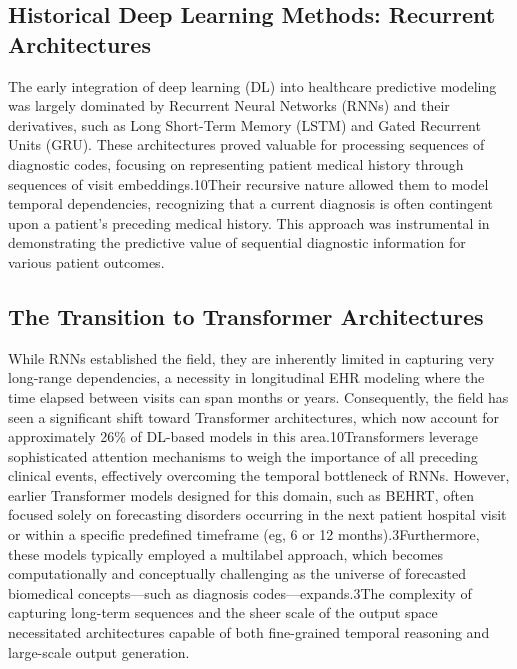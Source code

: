 \subsection{Historical Deep Learning Methods: Recurrent Architectures}
The early integration of deep learning (DL) into healthcare predictive modeling was largely dominated by Recurrent Neural Networks (RNNs) and their derivatives, such as Long Short-Term Memory (LSTM) and Gated Recurrent Units (GRU). These architectures proved valuable for processing sequences of diagnostic codes, focusing on representing patient medical history through sequences of visit embeddings.10Their recursive nature allowed them to model temporal dependencies, recognizing that a current diagnosis is often contingent upon a patient's preceding medical history. This approach was instrumental in demonstrating the predictive value of sequential diagnostic information for various patient outcomes.

\subsection{The Transition to Transformer Architectures}
While RNNs established the field, they are inherently limited in capturing very long-range dependencies, a necessity in longitudinal EHR modeling where the time elapsed between visits can span months or years. Consequently, the field has seen a significant shift toward Transformer architectures, which now account for approximately 26\% of DL-based models in this area.10Transformers leverage sophisticated attention mechanisms to weigh the importance of all preceding clinical events, effectively overcoming the temporal bottleneck of RNNs.
However, earlier Transformer models designed for this domain, such as BEHRT, often focused solely on forecasting disorders occurring in the next patient hospital visit or within a specific predefined timeframe (eg, 6 or 12 months).3Furthermore, these models typically employed a multilabel approach, which becomes computationally and conceptually challenging as the universe of forecasted biomedical concepts—such as diagnosis codes—expands.3The complexity of capturing long-term sequences and the sheer scale of the output space necessitated architectures capable of both fine-grained temporal reasoning and large-scale output generation.

